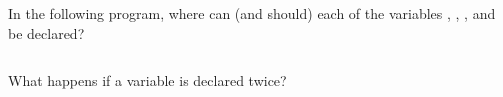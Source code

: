 In the following program, where can (and should) each of the variables , , ,  and  be declared?

\inputminted{csharp}{\context/question/Scope.cs}

What happens if a variable is declared twice?
